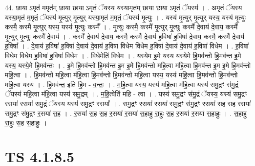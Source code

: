 \documentclass[17pt]{extarticle}
\begin{document}
44. छा॒या ऽमृत॑ म॒मृत॑म् छा॒या छा॒या ऽमृतं॒ ॅयस्य॒ यस्या॒मृत॑म् छा॒या छा॒या ऽमृतं॒ ॅयस्य॑ । . अ॒मृतं॒ ॅयस्य॒ यस्या॒मृत॑ म॒मृतं॒ ॅयस्य॑ मृ॒त्युर् मृ॒त्युर् यस्या॒मृत॑ म॒मृतं॒ ॅयस्य॑ मृ॒त्युः । . यस्य॑ मृ॒त्युर् मृ॒त्युर् यस्य॒ यस्य॑ मृ॒त्युः कस्मै॒ कस्मै॑ मृ॒त्युर् यस्य॒ यस्य॑ मृ॒त्युः कस्मै᳚ । . मृ॒त्युः कस्मै॒ कस्मै॑ मृ॒त्युर् मृ॒त्युः कस्मै॑ दे॒वाय॑ दे॒वाय॒ कस्मै॑ मृ॒त्युर् मृ॒त्युः कस्मै॑ दे॒वाय॑ । . कस्मै॑ दे॒वाय॑ दे॒वाय॒ कस्मै॒ कस्मै॑ दे॒वाय॑ ह॒विषा॑ ह॒विषा॑ दे॒वाय॒ कस्मै॒ कस्मै॑ दे॒वाय॑ ह॒विषा᳚ । . दे॒वाय॑ ह॒विषा॑ ह॒विषा॑ दे॒वाय॑ दे॒वाय॑ ह॒विषा॑ विधेम विधेम ह॒विषा॑ दे॒वाय॑ दे॒वाय॑ ह॒विषा॑ विधेम । . ह॒विषा॑ विधेम विधेम ह॒विषा॑ ह॒विषा॑ विधेम । . वि॒धे॒मेति॑ विधेम । . यस्ये॒म इ॒मे यस्य॒ यस्ये॒मे हि॒मव॑न्तो हि॒मव॑न्त इ॒मे यस्य॒ यस्ये॒मे हि॒मव॑न्तः । . इ॒मे हि॒मव॑न्तो हि॒मव॑न्त इ॒म इ॒मे हि॒मव॑न्तो महि॒त्वा म॑हि॒त्वा हि॒मव॑न्त इ॒म इ॒मे हि॒मव॑न्तो महि॒त्वा । . हि॒मव॑न्तो महि॒त्वा म॑हि॒त्वा हि॒मव॑न्तो हि॒मव॑न्तो महि॒त्वा यस्य॒ यस्य॑ महि॒त्वा हि॒मव॑न्तो हि॒मव॑न्तो महि॒त्वा यस्य॑ । . हि॒मव॑न्त॒ इति॑ हि॒म - व॒न्तः॒ । . म॒हि॒त्वा यस्य॒ यस्य॑ महि॒त्वा म॑हि॒त्वा यस्य॑ समु॒द्रꣳ स॑मु॒द्रं ॅयस्य॑ महि॒त्वा म॑हि॒त्वा यस्य॑ समु॒द्रम् । . म॒हि॒त्वेति॑ महि - त्वा । . यस्य॑ समु॒द्रꣳ स॑मु॒द्रं ॅयस्य॒ यस्य॑ समु॒द्रꣳ र॒सया॑ र॒सया॑ समु॒द्रं ॅयस्य॒ यस्य॑ समु॒द्रꣳ र॒सया᳚ । . स॒मु॒द्रꣳ र॒सया॑ र॒सया॑ समु॒द्रꣳ स॑मु॒द्रꣳ र॒सया॑ स॒ह स॒ह र॒सया॑ समु॒द्रꣳ स॑मु॒द्रꣳ र॒सया॑ स॒ह । . र॒सया॑ स॒ह स॒ह र॒सया॑ र॒सया॑ स॒हाहु रा॒हुः स॒ह र॒सया॑ र॒सया॑ स॒हाहुः । . स॒हाहु रा॒हुः स॒ह स॒हाहुः । \newline
\pagebreak
{}

\section{ TS 4.1.8.5 }
\end{document}
